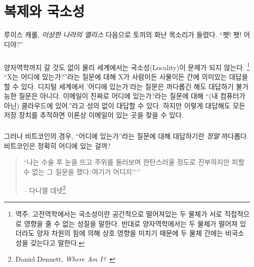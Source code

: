 \chapter{복제와 국소성}
\label{les:3}

\begin{chapquote}{루이스 캐롤, \textit{이상한 나라의 앨리스}}
	다음으로 토끼의 화난 목소리가 들렸다. \enquote{팻! 팻! 어디야?}
\end{chapquote}

\paragraph{}
양자역학까지 갈 것도 없이 물리 세계에서는 국소성(Locality)이 문제가 되지 않는다.
\footnote{역주: 고전역학에서는 국소성이란 공간적으로 떨어져있는 두 물체가 서로 직접적으로 영향을 줄 수 없는 성질을 말한다. 
반대로 양자역학에서는 두 물체가 떨어져 있더라도 양자 차원의 힘에 의해 상호 영향을 미치기 때문에 두 물체 간에는 비국소성을 갖는다고 말한다.}
\enquote{X는 어디에 있는가?}라는 질문에 대해 X가 사람이든 사물이든 간에 의미있는 대답을 할 수 있다. 
디지털 세계에서 '어디에 있는가'라는 질문은 까다롭긴 해도 대답하기 불가능한 질문은 아니다. 
이메일이 진짜로 어디에 있는가?라는 질문에 대해 \enquote{(내 컴퓨터가 아닌) 클라우드에 있어.}라고 성의 없이 대답할 수 있다.
하지만 이렇게 대답해도 모든 저장 장치를 추적하면 이론상 이메일이 있는 곳을 찾을 수 있다.

\paragraph{}
그러나 비트코인의 경우, \enquote{어디에 있는가}라는 질문에 대해 대답하기란 \textit{정말} 까다롭다. 비트코인은 정확히 어디에 있는 걸까?

\begin{quotation}\begin{samepage}
		\enquote{나는 수술 후 눈을 뜨고 주위를 둘러보며 한탄스러울 정도로 진부하지만 피할 수 없는 그 질문을 했다.`여기가 어디지?`}
		\begin{flushright} -- 다니엘 데넷\footnote{Daniel Dennett, \textit{Where Am I?}~\cite{where-am-i}}
\end{flushright}\end{samepage}\end{quotation}

